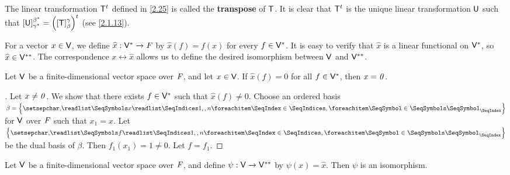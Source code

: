 \begin{note}
  The linear transformation \({\mathsf{T}}^{t}\) defined in \cref{2.25} is called the \textbf{transpose} of \(\mathsf{T}\).
  It is clear that \({\mathsf{T}}^{t}\) is the unique linear transformation \(\mathsf{U}\) such that \([\mathsf{U}]_{\gamma^*}^{\beta^*} = {\left\lparen[\mathsf{T}]_{\beta}^{\gamma}\right\rparen}^{t}\)
  (see \cref{2.1.13}).
\end{note}

\begin{defn}\label{2.6.7}
  For a vector \(x \in \mathsf{V}\), we define \(\widehat{x} : \mathsf{V}^* \to \mathit{F}\) by \(\widehat{x}(f) = f(x)\) for every \(f \in \mathsf{V}^*\).
  It is easy to verify that \(\widehat{x}\) is a linear functional on \(\mathsf{V}^*\), so \(\widehat{x} \in \mathsf{V}^{**}\).
  The correspondence \(x \leftrightarrow \widehat{x}\) allows us to define the desired isomorphism between \(\mathsf{V}\) and \(\mathsf{V}^{**}\).
\end{defn}

\begin{lem}\label{2.6.8}
  Let \(\mathsf{V}\) be a finite-dimensional vector space over \(\mathit{F}\), and let \(x \in \mathsf{V}\).
  If \(\widehat{x}(f) = 0\) for all \(f \in \mathsf{V}^*\), then \(x = \mathit{0}\).
\end{lem}

\begin{proof}[]
  Let \(x \neq \mathit{0}\).
  We show that there exists \(f \in \mathsf{V}^*\) such that \(\widehat{x}(f) \neq 0\).
  Choose an ordered basis \(\beta = \set{\seq{x}{1,,n}}\) for \(\mathsf{V}\) over \(\mathit{F}\) such that \(x_1 = x\).
  Let \(\set{\seq{f}{1,,n}}\) be the dual basis of \(\beta\).
  Then \(f_1(x_1) = 1 \neq 0\).
  Let \(f = f_1\).
\end{proof}

\begin{thm}\label{2.26}
  Let \(\mathsf{V}\) be a finite-dimensional vector space over \(\mathit{F}\), and define \(\psi : \mathsf{V} \to \mathsf{V}^{**}\) by \(\psi(x) = \widehat{x}\).
  Then \(\psi\) is an isomorphism.
\end{thm}

